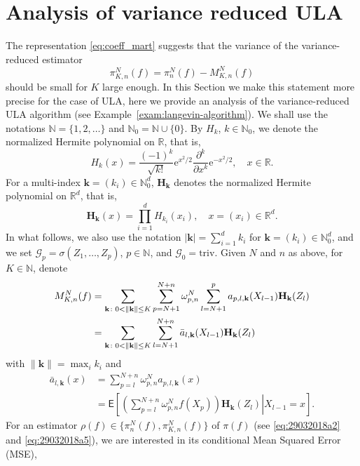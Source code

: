 \documentclass[article]{elsarticle}
\def\rme{\mathrm{e}}
\begin{document}
\section{Analysis of variance reduced ULA}
\label{sec:ula_analysis}
The representation \eqref{eq:coeff_mart} suggests that the variance of  the  variance-reduced estimator
\begin{equation}
\label{eq:29032018a3}
\pi_{K,n}^N(f)=\pi_n^N(f)-M_{K,n}^N(f)
\end{equation}
should be small for \(K\) large enough. In this Section  we make this statement more precise for the case of ULA, here we provide  an analysis of the variance-reduced ULA  algorithm (see Example~\ref{exam:langevin-algorithm}).
We shall use the notations $\mathbb N=\{1,2,\ldots\}$ and $\mathbb N_0=\mathbb N\cup\{0\}$.
By $H_k$, $k\in\mathbb N_0$,
we denote the normalized Hermite polynomial on $\mathbb R$, that is,
$$
H_k(x)=\frac{(-1)^k}{\sqrt{k!}}\rme^{x^2/2}\frac{\partial^k}{\partial x^k}\rme^{-x^2/2},
\quad x\in\mathbb R.
$$
For a multi-index $\mathbf{k}=(k_i)\in\mathbb N_0^d$,
$\mathbf{H}_\mathbf{k}$ denotes the normalized Hermite polynomial on $\mathbb R^d$, that is,
$$
\mathbf{H}_\mathbf{k}(x)=\prod_{i=1}^d H_{k_i}(x_i),\quad x=(x_i)\in\mathbb R^d.
$$
In what follows, we also use the notation
$|\mathbf{k}|=\sum_{i=1}^d k_i$ for $\mathbf{k}=(k_i)\in\mathbb N_0^d$,
and we set $\mathcal G_p=\sigma(Z_1,\ldots,Z_p)$, $p\in\mathbb N$, and $\mathcal G_0=\mathrm{triv}$.
Given $N$ and $n$ as above, for $K\in\mathbb N$, denote
\begin{align}
M_{K,n}^N(f) & =\sum_{\mathbf k\colon 0<\|\mathbf{k}\|\le K}\sum_{p=N+1}^{N+n}\omega_{p,n}^{N}\sum_{l=N+1}^{p}a_{p,l,\mathbf{k}}(X_{l-1})\mathbf{H}_\mathbf{k}(Z_{l})
\label{eq:29032018a5}\\
&=\sum_{\mathbf k\colon 0<\|\mathbf{k}\|\le K}\sum_{l=N+1}^{N+n}\bar{a}_{l,\mathbf{k}}(X_{l-1})\mathbf{H}_\mathbf{k}(Z_{l})
\notag
\end{align}
with \(\|\mathbf{k}\|=\max_{i} k_i\) and
\begin{align*}
\bar{a}_{l,\mathbf{k}}(x)
& =\sum_{p=l}^{N+n}\omega_{p,n}^{N}a_{p,l,\mathbf{k}}(x)\\
& =\mathsf{E}\left[\left.\left(\sum_{p=l}^{N+n}\omega_{p,n}^{N}f(X_{p})\right)\mathbf{H}_\mathbf{k}\left(Z_{l}\right)\right|X_{l-1}=x\right].
\end{align*}
For an estimator $\rho(f)\in\{\pi_n^N(f),\pi_{K,n}^N(f)\}$
of $\pi(f)$ (see \eqref{eq:29032018a2} and \eqref{eq:29032018a5}), we are interested in its conditional
Mean Squared Error (MSE),
\end{document}
